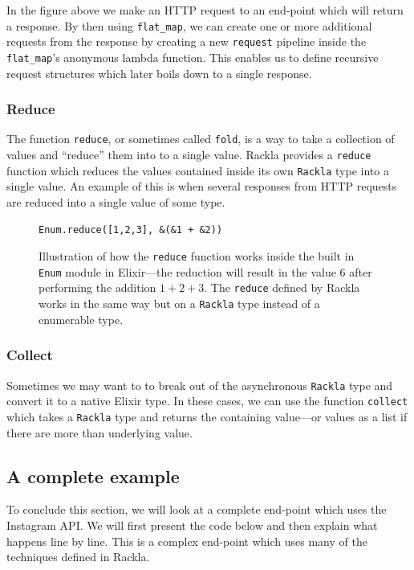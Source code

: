 \documentclass{cslthse-msc}
\begin{document}
In the figure above we make an HTTP request to an end-point which will return a response. By then using \lstinline{flat_map}, we can create one or more additional requests from the response by creating a new \lstinline{request} pipeline inside the \lstinline{flat_map}'s anonymous lambda function. This enables us to define recursive request structures which later boils down to a single response.

\subsubsection{Reduce}
The function \lstinline{reduce}, or sometimes called \lstinline{fold}, is a way to take a collection of values and \enquote{reduce} them into to a single value. Rackla provides a \lstinline{reduce} function which reduces the values contained inside its own \lstinline{Rackla} type into a single value. An example of this is when several responses from HTTP requests are reduced into a single value of some type.

\begin{figure}[H]
  \centering
\begin{lstlisting}[breaklines=true,frame=single]
Enum.reduce([1,2,3], &(&1 + &2))
\end{lstlisting}
  \caption{Illustration of how the \lstinline{reduce} function works inside the built in \lstinline{Enum} module in Elixir---the reduction will result in the value $6$ after performing the addition $1+2+3$. The \lstinline{reduce} defined by Rackla works in the same way but on a \lstinline{Rackla} type instead of a enumerable type.}
\end{figure}

\subsubsection{Collect}
Sometimes we may want to to break out of the asynchronous \lstinline{Rackla} type and convert it to a native Elixir type. In these cases, we can use the function \lstinline{collect} which takes a \lstinline{Rackla} type and returns the containing value---or values as a list if there are more than underlying value.

\clearpage

\pagebreak

\subsection{A complete example}
To conclude this section, we will look at a complete end-point which uses the Instagram API\cite{instagram_api}. We will first present the code below and then explain what happens line by line. This is a complex end-point which uses many of the techniques defined in Rackla.
\end{document}
